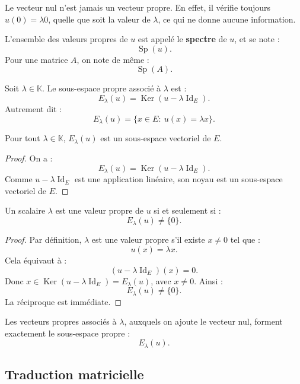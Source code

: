 \documentclass[11pt,a4paper]{article}
\newcommand{\K}{\mathbb K}
\newcommand{\Ker}{\operatorname{Ker}}
\newcommand{\Id}{\operatorname{Id}}
\newcommand{\Sp}{\operatorname{Sp}}
\begin{document}
\begin{erreurbox}
Le vecteur nul n'est jamais un vecteur propre.  
En effet, il vérifie toujours \(u(0)=\lambda 0\), quelle que soit la valeur de \(\lambda\), ce qui ne donne aucune information.
\end{erreurbox}

\begin{definitionbox}[Spectre]
L'ensemble des valeurs propres de \(u\) est appelé le \textbf{spectre} de \(u\), et se note :
\[
\Sp(u).
\]
Pour une matrice \(A\), on note de même :
\[
\Sp(A).
\]
\end{definitionbox}

\begin{definitionbox}
Soit \(\lambda\in\K\).  
Le sous-espace propre associé à \(\lambda\) est :
\[
E_\lambda(u)=\Ker(u-\lambda\Id_E).
\]
Autrement dit :
\[
E_\lambda(u)=\{x\in E:\ u(x)=\lambda x\}.
\]
\end{definitionbox}

\begin{theorembox}
Pour tout \(\lambda\in\K\), \(E_\lambda(u)\) est un sous-espace vectoriel de \(E\).
\end{theorembox}

\begin{proof}
On a :
\[
E_\lambda(u)=\Ker(u-\lambda\Id_E).
\]
Comme \(u-\lambda\Id_E\) est une application linéaire, son noyau est un sous-espace vectoriel de \(E\).
\end{proof}

\begin{theorembox}
Un scalaire \(\lambda\) est une valeur propre de \(u\) si et seulement si :
\[
E_\lambda(u)\neq\{0\}.
\]
\end{theorembox}

\begin{proof}
Par définition, \(\lambda\) est une valeur propre s'il existe \(x\neq0\) tel que :
\[
u(x)=\lambda x.
\]
Cela équivaut à :
\[
(u-\lambda\Id_E)(x)=0.
\]
Donc \(x\in\Ker(u-\lambda\Id_E)=E_\lambda(u)\), avec \(x\neq0\).  
Ainsi :
\[
E_\lambda(u)\neq\{0\}.
\]
La réciproque est immédiate.
\end{proof}

\begin{retenirbox}
Les vecteurs propres associés à \(\lambda\), auxquels on ajoute le vecteur nul, forment exactement le sous-espace propre :
\[
E_\lambda(u).
\]
\end{retenirbox}

\subsection{Traduction matricielle}
\end{document}

